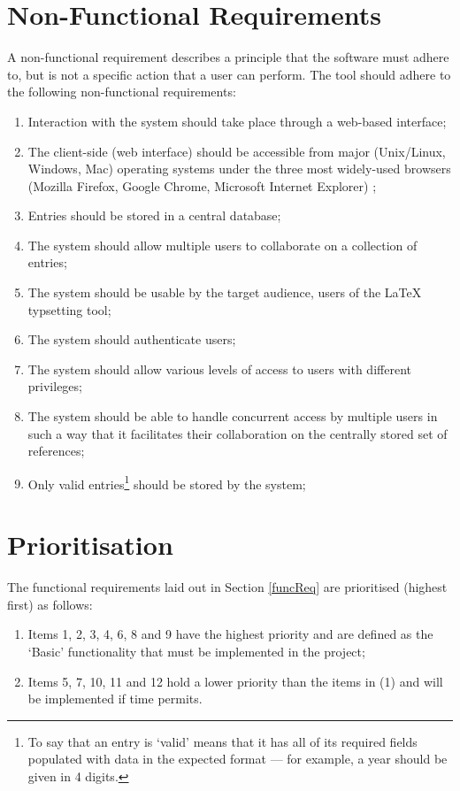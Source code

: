 \section{Non-Functional Requirements}
\label{nfReq}
A non-functional requirement describes a principle that the software must adhere to, but is not a specific action that a user can perform.  The tool should adhere to the following non-functional requirements:
\begin{enumerate}
\item Interaction with the system should take place through a web-based interface;
\item The client-side (web interface) should be accessible from major (Unix/Linux, Windows, Mac) operating systems under the three most widely-used browsers (Mozilla Firefox, Google Chrome, Microsoft Internet Explorer) \cite{w3cBrowserStats};
\item Entries should be stored in a central database;
\item The system should allow multiple users to collaborate on a collection of \bibtex{} entries;
\item The system should be usable by the target audience, users of the \LaTeX{} typsetting tool;
\item The system should authenticate users;
\item The system should allow various levels of access to users with different
privileges;
\item The system should be able to handle concurrent access by multiple users in such a way that it facilitates their collaboration on the centrally stored set of references;
\item Only valid entries\footnote{To say that an entry is `valid' means that it has all of its required fields populated with data in the expected format --- for example, a year should be given in 4 digits.} should be stored by the system;
\end{enumerate}

\section{Prioritisation}
The functional requirements laid out in Section \ref{funcReq} are prioritised (highest first) as follows:
\begin{enumerate}
	\item Items 1, 2, 3, 4, 6, 8 and 9 have the highest priority and are defined as the `Basic' functionality that must be implemented in the project;
	\item Items 5, 7, 10, 11 and 12 hold a lower priority than the items in (1) and will be implemented if time permits.
\end{enumerate}


